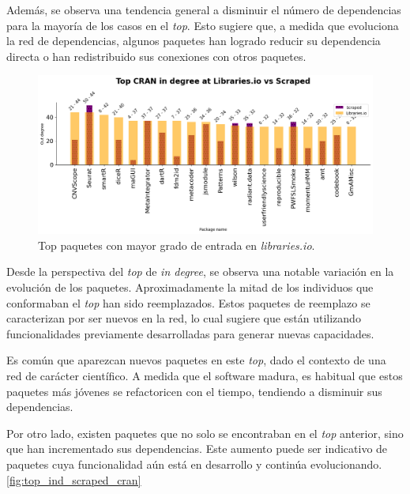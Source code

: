 Además, se observa una tendencia general a disminuir el número de dependencias para la mayoría de
los casos en el \textit{top}. Esto sugiere que, a medida que evoluciona la red de dependencias,
algunos paquetes han logrado reducir su dependencia directa o han redistribuido sus conexiones
con otros paquetes.


\begin{figure}[ht!]
    \begin{center}
        \includegraphics[width=1\textwidth]{img/cran/top_ind_libio.png}
        \caption{Top paquetes con mayor grado de entrada en \textit{libraries.io}.}
        \label{fig:top_ind_libio_cran}
    \end{center}
\end{figure}


Desde la perspectiva del \textit{top} de \textit{in degree}, se observa una notable variación en
la evolución de los paquetes. Aproximadamente la mitad de los individuos que conformaban el
\textit{top} han sido reemplazados. Estos paquetes de reemplazo se caracterizan por ser nuevos
en la red, lo cual sugiere que están utilizando funcionalidades previamente desarrolladas para
generar nuevas capacidades.

Es común que aparezcan nuevos paquetes en este \textit{top}, dado el contexto de una red de
carácter científico. A medida que el software madura, es habitual que estos paquetes más
jóvenes se refactoricen con el tiempo, tendiendo a disminuir sus dependencias.

Por otro lado, existen paquetes que no solo se encontraban en el \textit{top} anterior,
sino que han incrementado sus dependencias. Este aumento puede ser indicativo de paquetes
cuya funcionalidad aún está en desarrollo y continúa evolucionando. \ref{fig:top_ind_scraped_cran}

